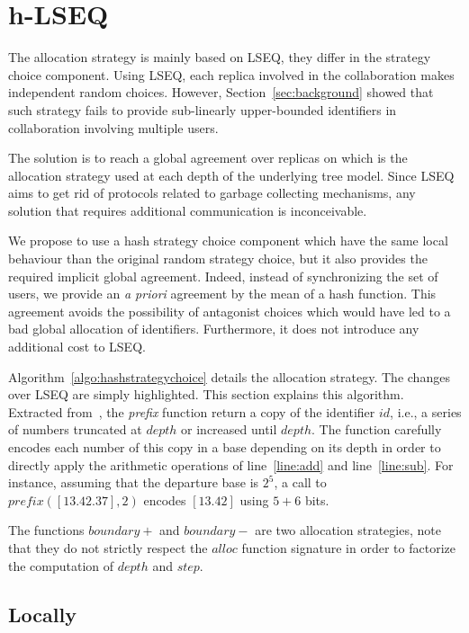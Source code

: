 
\section{h-LSEQ}
\label{sec:proposal}

The \NAME{} allocation strategy is mainly based on LSEQ, they differ in the
strategy choice component. Using LSEQ, each replica involved in the
collaboration makes independent random choices. However,
Section~\ref{sec:background} showed that such strategy fails to provide
sub-linearly upper-bounded identifiers in collaboration involving multiple
users.

The solution is to reach a global agreement over replicas on which is the
allocation strategy used at each depth of the underlying tree model. Since LSEQ
aims to get rid of protocols related to garbage collecting mechanisms, any
solution that requires additional communication is inconceivable.

We propose to use a hash strategy choice component which have the same local
behaviour than the original random strategy choice, but it also provides the
required implicit global agreement. Indeed, instead of synchronizing the set of
users, we provide an \emph{a priori} agreement by the mean of a hash
function. This agreement avoids the possibility of antagonist choices which
would have led to a bad global allocation of identifiers. Furthermore, it does
not introduce any additional cost to LSEQ.



Algorithm~\ref{algo:hashstrategychoice} details the \NAME{} allocation
strategy. The changes over LSEQ are simply highlighted. This section explains
this algorithm. Extracted from~\cite{nedelec2013lseq}, the \emph{prefix}
function return a copy of the identifier $id$, i.e., a series of numbers
truncated at $depth$ or increased until $depth$. The function carefully encodes
each number of this copy in a base depending on its depth in order to directly
apply the arithmetic operations of line~\ref{line:add} and
line~\ref{line:sub}. For instance, assuming that the departure base is $2^5$, a
call to $prefix([13.42.37],2)$ encodes $[13.42]$ using $5+6$ bits.

The functions $boundary+$ and $boundary-$ are two allocation strategies, note
that they do not strictly respect the $alloc$ function signature in order to
factorize the computation of $depth$ and $step$.


\subsection{Locally}

